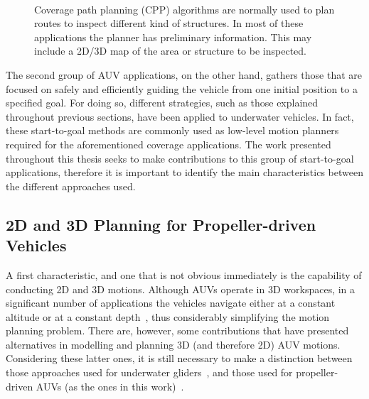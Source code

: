 \begin{figure}[htbp]
    \myfloatalign
     \\
\caption[Coverage path planning (CPP) applications.]
{Coverage path planning (CPP) algorithms are normally used to plan routes to
inspect different kind of structures. In most of these applications the planner
has preliminary information. This may include a 2D/3D map of the area or
structure to be inspected.}
\label{fig:CPP-App}
\end{figure}

The second group of \ac{AUV} applications, on the other hand, gathers those that
are focused on safely and efficiently guiding the vehicle from one initial
position to a specified goal. For doing so, different strategies, such as those
explained throughout previous sections, have been applied to underwater
vehicles. In fact, these start-to-goal methods are commonly used as low-level
motion planners required for the aforementioned coverage applications. The work
presented throughout this thesis seeks to make contributions to this group of
start-to-goal applications, therefore it is important to identify the main
characteristics between the different approaches used.

\subsection{2D and 3D Planning for Propeller-driven Vehicles}

A first characteristic, and one that is not obvious immediately is the
capability of conducting \ac{2D} and \ac{3D} motions. Although \acp{AUV}
operate in \ac{3D} workspaces, in a significant number of applications the
vehicles navigate either at a constant altitude or at a constant
depth~\cite{Carroll1992,Sequeira1994,Vasudevan1994,Arinaga1996,Petillot2001,Kawano2002,Alvarez2004,Hong-jian2004,Tan2004,Garau2005,Kruger2007,Petres2007,Yilmaz2008,Soulignac2009,Caldwell2010,Cheng2010,Poppinga2011,Soulignac2011,Kim2012a,McMahon2016},
thus considerably simplifying the motion planning problem. There are, however,
some contributions that have presented alternatives in modelling and planning
\ac{3D} (and therefore \ac{2D}) \ac{AUV} motions. Considering these latter ones,
it is still necessary to make a distinction between those approaches used for
underwater gliders~\cite{Smith2010,Thompson2010,Wehbe2014,Cao2016}, and those
used for propeller-driven \acp{AUV} (as the ones in this
work)~\cite{Warren1990,Sugihara1997,Qu2009,Murthy2010,Yan2012,Heo2013,Taleshian2015,Ni2016}.

